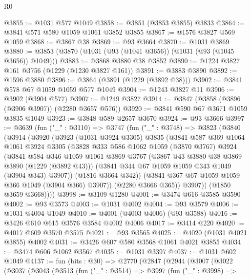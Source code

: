 \begin{lexlean}{R0}
\begin{coremodule}
@3855 := @1031 @577 @1049
@3858 := @3851 (@3853 @3855) @3833
@3864 := @3841 @571 @580 @1059 @1061 @3852 @3855
@3867 := @1576 @3827 @569 @1059
@3868 := @3867 @38
@3869 := @93 @3664
@3870 := @1031 @3869
@3880 := @3853 (@3870 (@1031 (@93 (@1041 @3656)) (@1031 (@93 (@1045 @3656)) @1049)))
@3883 := @3868 @3880 @38 @3852
@3890 := @1224 @3827 @161 @3756 (@1229 (@1230 @3827 @161))
@3891 := @3883 @3890
@3892 := @1596 @3880
@3896 := @3864 (@3891 (@1229 (@3892 @38)))
@3902 := @3841 @578 @67 @1059 @1059 @577 @1049
@3904 := @1243 @3827 @11
@3906 := @3902 (@3904 @577)
@3907 := @1249 @3827
@3914 := @3847 (@3858 (@3896 (@3906 @3907)) (@2280 @3657 @576))
@3920 := @3841 @590 @67 @3671 @1059 @3835 @1049
@3923 := @3848 @589 @2657 @3670
@3924 := @93 @3666
@3997 := @3639
    (fun ("_" : @3110) =>
    @3747
      (fun ("_" : @3748) =>
      @3823
        (@3840
          (@3914
            (@3920
              (@3923
                (@1031 @3924 @3305)
                @3835
                (@3841
                  @587
                  @369
                  @1064
                  @1061
                  @3924
                  @3305
                  (@3828
                    @333
                    @586
                    @1062
                    @1059
                    (@3870 @3767)
                    @3924
                    (@3841
                      @584
                      @346
                      @1059
                      @1061
                      @3869
                      @3767
                      (@3867 @43 @3880 @38 @3869 @3890 (@1229 (@3892 @43)))
                      (@3841 @344 @67 @1059 @1059 @343 @1049 (@3904 @343) @3907))
                    (@1816 @3664 @342))
                  (@3841 @367 @67 @1059 @1059 @366 @1049 (@3904 @366) @3907))
                (@2280 @3666 @365))
              @3907))
          (@1850 @3659 @3668))))
@3998 := @3109 @1280
@4001 := @3474 @616 @3585 @3590
@4002 := @93 @3573
@4003 := @1031 @4002
@4004 := @93 @3579
@4006 := @1031 @4004 @1049
@4010 := @4001 (@4003 @4006) (@93 @3588)
@4016 := @3426 @610 @615 @3576 @3584 @4002 @4006
@4017 := @3414 @220
@4020 := @4017 @609 @3570 @3575
@4021 := @93 @3565
@4025 := @4020 (@1031 @4021 @3855) @4002
@4031 := @3426 @607 @580 @3568 @1061 @4021 @3855
@4034 := @3474 @606 @1062 @3567
@4035 := @1031 @3397
@4037 := @1031 @602 @1049
@4137 := fun (bits : @30) =>
  @2770
    (@2847
      (@2944
        (@3007
          (@3022
            (@3037
              (@3043
                (@3513
                  (fun ("_" : @3514) =>
                  @3997
                    (fun ("_" : @3998) =>

\end{coremodule}
\end{lexlean}
